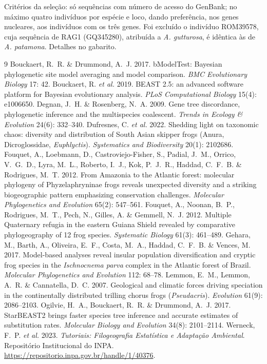 \documentclass[11pt,a4paper]{article}
\begin{document}
\begin{resposta}
Critérios da seleção: só sequências com número de acesso do GenBank; no máximo quatro
indivíduos por espécie e loco, dando preferência, nos genes nucleares, aos indivíduos com os
três genes. Foi excluído o indivíduo ROM39578, cuja sequência de RAG1 (GQ345280), atribuída a
\emph{A. gutturosa}, é idêntica às de \emph{A. patamona}. Detalhes no gabarito.
\end{resposta}

\begin{thebibliography}{9}
 Bouckaert, R.~R. \& Drummond, A.~J. 2017. bModelTest: Bayesian
phylogenetic site model averaging and model comparison. \emph{BMC Evolutionary Biology} 17: 42.
 Bouckaert, R. \emph{et al.} 2019. BEAST 2.5: an advanced software
platform for Bayesian evolutionary analysis. \emph{PLoS Computational Biology} 15(4): e1006650.
 Degnan, J.~H. \& Rosenberg, N.~A. 2009. Gene tree discordance,
phylogenetic inference and the multispecies coalescent. \emph{Trends in Ecology \& Evolution}
24(6): 332--340.
 Dufresnes, C. \emph{et al.} 2022. Shedding light on taxonomic chaos:
diversity and distribution of South Asian skipper frogs (Anura, Dicroglossidae,
\emph{Euphlyctis}). \emph{Systematics and Biodiversity} 20(1): 2102686.
 Fouquet, A., Loebmann, D., Castroviejo-Fisher, S., Padial, J.~M.,
Orrico, V.~G.~D., Lyra, M.~L., Roberto, I.~J., Kok, P.~J.~R., Haddad, C.~F.~B. \& Rodrigues,
M.~T. 2012. From Amazonia to the Atlantic forest: molecular phylogeny of Phyzelaphryninae frogs
reveals unexpected diversity and a striking biogeographic pattern emphasizing conservation
challenges. \emph{Molecular Phylogenetics and Evolution} 65(2): 547--561.
 Fouquet, A., Noonan, B.~P., Rodrigues, M.~T., Pech, N., Gilles, A. \&
Gemmell, N.~J. 2012. Multiple Quaternary refugia in the eastern Guiana Shield revealed by
comparative phylogeography of 12 frog species. \emph{Systematic Biology} 61(3): 461--489.
 Gehara, M., Barth, A., Oliveira, E.~F., Costa, M.~A., Haddad, C.~F.~B.
\& Vences, M. 2017. Model-based analyses reveal insular population diversification and cryptic
frog species in the \emph{Ischnocnema parva} complex in the Atlantic forest of Brazil.
\emph{Molecular Phylogenetics and Evolution} 112: 68--78.
 Lemmon, E.~M., Lemmon, A.~R. \& Cannatella, D.~C. 2007. Geological and
climatic forces driving speciation in the continentally distributed trilling chorus frogs
(\emph{Pseudacris}). \emph{Evolution} 61(9): 2086--2103.
 Ogilvie, H.~A., Bouckaert, R.~R. \& Drummond, A.~J. 2017. StarBEAST2
brings faster species tree inference and accurate estimates of substitution rates.
\emph{Molecular Biology and Evolution} 34(8): 2101--2114.
 Werneck, F.~P. \emph{et al.} 2023. \emph{Tutoriais: Filogeografia
Estatística e Adaptação Ambiental}. Repositório Institucional do INPA.
\url{https://repositorio.inpa.gov.br/handle/1/40376}.
\end{thebibliography}
\end{document}
